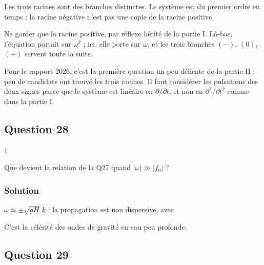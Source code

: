 \documentclass[11pt,a4paper]{article}
\newcommand{\equationajustee}[1]{%
  \sbox{\boiteequation}{$\displaystyle #1$}%
  \ifdim\wd\boiteequation>\linewidth
    \[\resizebox{\linewidth}{!}{\usebox{\boiteequation}}\]%
  \else
    \[#1\]%
  \fi}
\begin{document}
Les trois racines sont des branches distinctes. Le système est du premier ordre en temps : la racine négative n'est pas une copie de la racine positive.

\begin{piege}

Ne garder que la racine positive, par réflexe hérité de la partie I. Là-bas, l'équation portait sur \(\omega^2\) ; ici, elle porte sur \(\omega\), et les trois branches \((-)\), \((0)\), \((+)\) servent toute la suite.

\end{piege}

\begin{jury}

Pour le rapport 2026, c'est la première question un peu délicate de la partie II : peu de candidats ont trouvé les trois racines. Il faut considérer les pulsations des deux signes parce que le système est linéaire en \(\partial/\partial t\), et non en \(\partial^2/\partial t^2\) comme dans la partie I.

\end{jury}

\hypertarget{question-28}{%
\subsection{Question 28}\label{question-28}}

\begin{indication}{1}

Que devient la relation de la Q27 quand \(\lvert\omega\rvert\gg\lvert f_0\rvert\) ?

\end{indication}

\hypertarget{solution-36}{%
\subsubsection{Solution}\label{solution-36}}

\(\omega\simeq\pm\sqrt{gH}\,k\) : la propagation est non dispersive, avec

\equationajustee{\boxed{c=\sqrt{gH}}}

C'est la célérité des ondes de gravité en eau peu profonde.

\hypertarget{question-29}{%
\subsection{Question 29}\label{question-29}}
\end{document}
